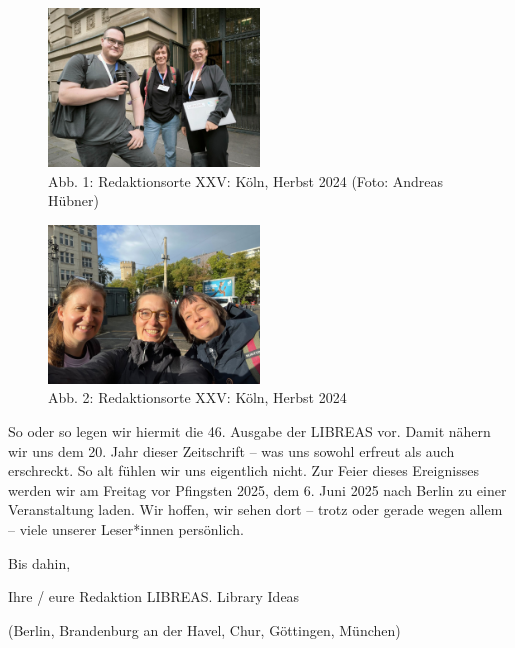 \documentclass[a4paper,
fontsize=11pt,
oneside,
numbers=noperiodatend,
parskip=half-,
bibliography=totoc,
final
]{scrartcl}
\begin{document}
\begin{figure}[H]
\centering
\includegraphics[width=0.5\textwidth]{img/redaktionsorte_koeln_I_Urheber_Andreas_Huebner.jpg}
\caption{Abb. 1: Redaktionsorte XXV: Köln, Herbst 2024 (Foto: Andreas Hübner)}
\end{figure}

\begin{figure}[H]
\centering
\includegraphics[width=0.5\textwidth]{img/redaktionsorte_koeln_II.jpg}
\caption{Abb. 2: Redaktionsorte XXV: Köln, Herbst 2024}
\end{figure}

So oder so legen wir hiermit die 46. Ausgabe der LIBREAS vor. Damit
nähern wir uns dem 20. Jahr dieser Zeitschrift – was uns sowohl erfreut
als auch erschreckt. So alt fühlen wir uns eigentlich nicht. Zur Feier
dieses Ereignisses werden wir am Freitag vor Pfingsten 2025, dem 6. Juni
2025 nach Berlin zu einer Veranstaltung laden. Wir hoffen, wir sehen
dort – trotz oder gerade wegen allem – viele unserer Leser*innen
persönlich.

Bis dahin,

Ihre / eure Redaktion LIBREAS. Library Ideas

(Berlin, Brandenburg an der Havel, Chur, Göttingen, München)

\end{document}
